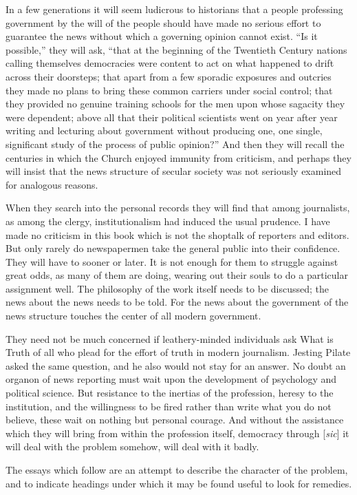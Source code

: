 \documentclass[openany,nobib,twoside,nohyper]{tufte-book}
\begin{document}
In a few generations it will seem ludicrous to historians that a people
professing government by the will of the people should have made no
serious effort to guarantee the news without which a governing opinion
cannot exist. ``Is it possible,'' they will ask, ``that at the beginning
of the Twentieth Century nations calling themselves democracies were
content to act on what happened to drift across their doorsteps; that
apart from a few sporadic exposures and outcries they made no plans to
bring these common carriers under social control; that they provided no
genuine training schools for the men upon whose sagacity they were
dependent; above all that their political scientists went on year after
year writing and lecturing about government without producing one, one
single, significant study of the process of public opinion?'' And then
they will recall the centuries in which the Church enjoyed immunity from
criticism, and perhaps they will insist that the news structure of
secular society was not seriously examined for analogous reasons.

When they search into the personal records they will find that among
journalists, as among the clergy, institutionalism had induced the usual
prudence. I have made no criticism in this book which is not the
shoptalk of reporters and editors. But only rarely do newspapermen take
the general public into their confidence. They will have to sooner or
later. It is not enough for them to struggle against great odds, as many
of them are doing, wearing out their souls to do a particular assignment
well. The philosophy of the work itself needs to be discussed; the news
about the news needs to be told. For the news about the government of
the news structure touches the center of all modern government.

They need not be much concerned if leathery-minded individuals ask What
is Truth of all who plead for the effort of truth in modern journalism.
Jesting Pilate asked the same question, and he also would not stay for
an answer. No doubt an organon of news reporting must wait upon the
development of psychology and political science. But resistance to the
inertias of the profession, heresy to the institution, and the
willingness to be fired rather than write what you do not believe, these
wait on nothing but personal courage. And without the assistance which
they will bring from within the profession itself, democracy through [\emph{sic}] it
will deal with the problem somehow, will deal with it badly.

The essays which follow are an attempt to describe the character of the
problem, and to indicate headings under which it may be found useful to
look for remedies.
\end{document}
